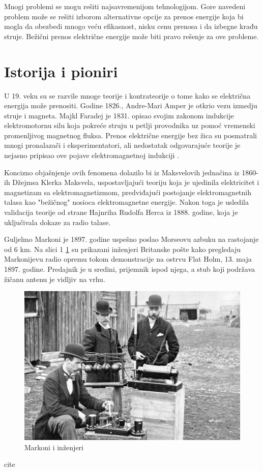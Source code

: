 \documentclass[a4paper]{article}
\begin{document}
Mnogi problemi se mogu rešiti najsavremenijom tehnologijom. Gore navedeni problem može se rešiti izborom alternativne opcije za prenos energije koja bi mogla da obezbedi mnogo veću efikasnost, nisku cenu prenosa i da izbegne krađu struje. Bežični prenos električne energije može biti pravo rešenje za ove probleme.

\section{Istorija i pioniri}

U 19. veku su se razvile mnoge teorije i kontrateorije o tome kako se električna energija može prenositi. Godine 1826., Andre-Mari Amper je otkrio vezu izmedju struje i magneta. Majkl Faradej je 1831. opisao svojim zakonom indukcije elektromotornu silu koja pokreće struju u petlji provodnika uz pomoć vremenski promenljivog magnetnog fluksa. Prenos električne energije bez žica su posmatrali mnogi pronalazači i eksperimentatori, ali nedostatak odgovarajuće teorije je nejasno pripisao ove pojave elektromagnetnoj indukciji \cite{enwiki:1118144890}.

Koncizno objašnjenje ovih fenomena dolazilo bi iz Maksvelovih jednačina iz 1860-ih Džejmsa Klerka Maksvela, uspostavljajući teoriju koja je ujedinila elektricitet i magnetizam sa elektromagnetizmom, predviđajući postojanje elektromagnetnih talasa kao "bežičnog" nosioca elektromagnetne energije.
Nakon toga je usledila validacija teorije od strane Hajnriha Rudolfa Herca iz 1888. godine, koja je uključivala dokaze za radio talase.

Guljelmo Markoni je 1897. godine uspešno poslao Morseovu azbuku na rastojanje od 6 km.
Na slici 1 \ref{fig:my_labela} su prikazani inženjeri Britanske pošte kako pregledaju Markonijevu radio opremu tokom demonstracije na ostrvu Flat Holm, 13. maja 1897. godine. Predajnik je u sredini, prijemnik ispod njega, a stub koji podržava žičanu antenu je vidljiv na vrhu.

\begin{figure}[h!]
    \centering
    \includegraphics[scale=0.2]{Markoni.jpg}
    \caption{Markoni i inženjeri}
    \label{fig:my_labela}
\end{figure}
cite
\end{document}

